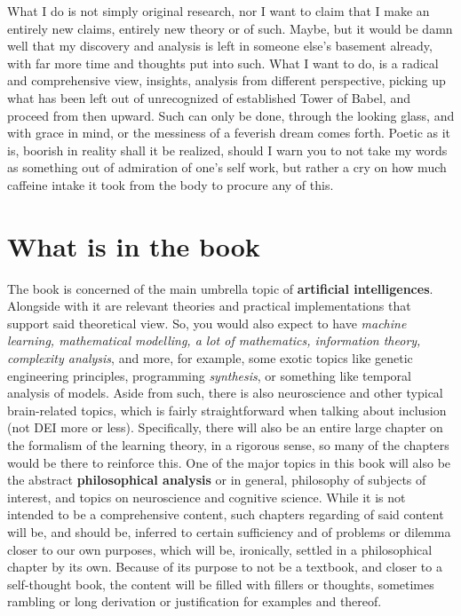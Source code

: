 What I do is not simply original research, nor I want to claim that I make an entirely new claims, entirely new theory or of such. Maybe, but it would be damn well that my discovery and analysis is left in someone else's basement already, with far more time and thoughts put into such. What I want to do, is a radical and comprehensive view, insights, analysis from different perspective, picking up what has been left out of unrecognized of established Tower of Babel, and proceed from then upward. Such can only be done, through the looking glass, and with grace in mind, or the messiness of a feverish dream comes forth. Poetic as it is, boorish in reality shall it be realized, should I warn you to not take my words as something out of admiration of one's self work, but rather a cry on how much caffeine intake it took from the body to procure any of this. 

\section{What is in the book}
The book is concerned of the main umbrella topic of \textbf{artificial intelligences}. Alongside with it are relevant theories and practical implementations that support said theoretical view. So, you would also expect to have \textit{machine learning, mathematical modelling, a lot of mathematics, information theory, complexity analysis}, and more, for example, some exotic topics like genetic engineering principles, programming \textit{synthesis}, or something like temporal analysis of models. Aside from such, there is also neuroscience and other typical brain-related topics, which is fairly straightforward when talking about inclusion (not DEI more or less). Specifically, there will also be an entire large chapter on the formalism of the learning theory, in a rigorous sense, so many of the chapters would be there to reinforce this. One of the major topics in this book will also be the abstract \textbf{philosophical analysis} or in general, philosophy of subjects of interest, and topics on neuroscience and cognitive science. While it is not intended to be a comprehensive content, such chapters regarding of said content will be, and should be, inferred to certain sufficiency and of problems or dilemma closer to our own purposes, which will be, ironically, settled in a philosophical chapter by its own. Because of its purpose to not be a textbook, and closer to a self-thought book, the content will be filled with fillers or thoughts, sometimes rambling or long derivation or justification for examples and thereof. 

